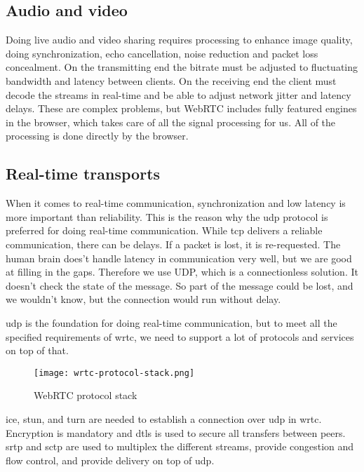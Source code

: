 \subsection{Audio and video}
Doing live audio and video sharing requires processing to enhance image quality, doing synchronization, echo cancellation, noise reduction and packet loss concealment\cite{grigorik_high_2013}. On the transmitting end the bitrate must be adjusted to fluctuating bandwidth and latency between clients. On the receiving end the client must decode the streams in real-time and be able to adjust network jitter and latency delays. These are complex problems, but WebRTC includes fully featured engines in the browser, which takes care of all the signal processing for us. All of the processing is done directly by the browser.

\subsection{Real-time transports}
When it comes to real-time communication, synchronization and low latency is more important than reliability. This is the reason why the \gls{udp} protocol is preferred for doing real-time communication. While \gls{tcp} delivers a reliable communication, there can be delays. If a packet is lost, it is re-requested. The human brain does't handle latency in communication very well, but we are good at filling in the gaps. Therefore we use UDP, which is a connectionless solution. It doesn't check the state of the message. So part of the message could be lost, and we wouldn't know, but the connection would run without delay.

\gls{udp} is the foundation for doing real-time communication, but to meet all the specified requirements of \gls{wrtc}, we need to support a lot of protocols and services on top of that.

\begin{figure}[here]
\centerline{\texttt{[image: wrtc-protocol-stack.png]}}
\caption{WebRTC protocol stack}
\label{fig:wrtc-protocol-stack}
\end{figure}

\gls{ice}, \gls{stun}, and \gls{turn} are needed to establish a connection over \gls{udp} in \gls{wrtc}. Encryption is mandatory and \gls{dtls} is used to secure all transfers between peers. \gls{srtp} and \gls{sctp} are used to multiplex the different streams, provide congestion and flow control, and provide delivery on top of \gls{udp}.

